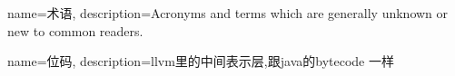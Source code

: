 {
    name=术语,
    description={Acronyms and terms which are generally unknown or new to common readers.}
}


{
    name=位码,
    description={llvm里的中间表示层,跟java的bytecode 一样}
}
